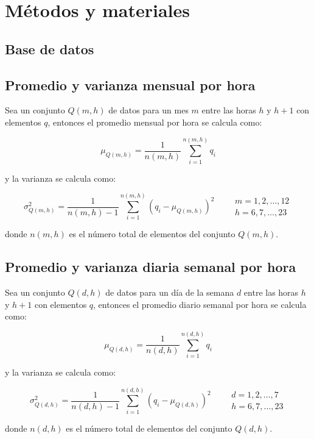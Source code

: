 \section{Métodos y materiales}

\subsection{Base de datos}

\subsection{Promedio y varianza mensual por hora}

Sea un conjunto $Q(m,h)$ de datos para un mes $m$  entre las horas $h$ y $h+1$ con elementos $q$, entonces el promedio mensual por hora se calcula como:

\begin{equation}
    \mu_{Q(m,h)} = \frac{1}{n(m,h)} \sum_{i=1}^{n(m,h)} q_i \label{eq:monthly_hourly_mean}
\end{equation}

y la varianza se calcula como:

\begin{equation}
    \sigma^2_{Q(m,h)} = \frac{1}{n(m,h)-1} \sum_{i=1}^{n(m,h)} (q_i - \mu_{Q(m,h)})^2 \qquad \begin{matrix}
        m=1,2,\dots,12 \\
        h=6,7,\dots,23
    \end{matrix} \label{eq:monthly_hourly_var}
\end{equation}

donde $n(m,h)$ es el número total de elementos del conjunto $Q(m,h)$.

\subsection{Promedio y varianza diaria semanal por hora}

Sea un conjunto $Q(d,h)$ de datos para un día de la semana $d$  entre las horas $h$ y $h+1$ con elementos $q$, entonces el promedio diario semanal por hora se calcula como:

\begin{equation}
    \mu_{Q(d,h)} = \frac{1}{n(d,h)} \sum_{i=1}^{n(d,h)} q_i \label{eq:daily_hourly_mean}
\end{equation}

y la varianza se calcula como:

\begin{equation}
    \sigma^2_{Q(d,h)} = \frac{1}{n(d,h)-1} \sum_{i=1}^{n(d,h)} (q_i - \mu_{Q(d,h)})^2 \qquad \begin{matrix}
        d=1,2,\dots,7 \\
        h=6,7,\dots,23
    \end{matrix} \label{eq:daily_hourly_var}
\end{equation}

donde $n(d,h)$ es el número total de elementos del conjunto $Q(d,h)$.